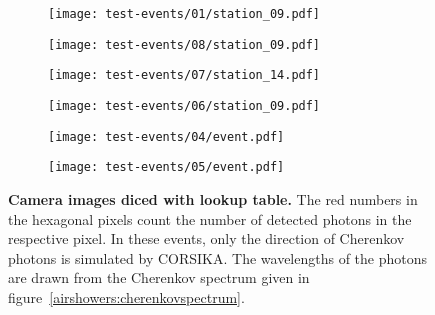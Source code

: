 \begin{figure}[H]
	\centering
	\begin{subfigure}[t]{0.49\textwidth}
		\texttt{[image: test-events/01/station\_09.pdf]}
		\subcaption{}
		\label{corsika-events:1}
	\end{subfigure}
	\hfill
	\begin{subfigure}[t]{0.49\textwidth}
		\texttt{[image: test-events/08/station\_09.pdf]}
		\subcaption{}
		\label{corsika-events:2}
	\end{subfigure}
	\vfill
	\begin{subfigure}[t]{0.49\textwidth}
		\texttt{[image: test-events/07/station\_14.pdf]}
		\subcaption{}
		\label{corsika-events:3}
	\end{subfigure}
	\hfill
	\begin{subfigure}[t]{0.49\textwidth}
		\texttt{[image: test-events/06/station\_09.pdf]}
		\subcaption{}
		\label{corsika-events:4}
	\end{subfigure}
	\hfill
	\begin{subfigure}[t]{0.49\textwidth}
		\texttt{[image: test-events/04/event.pdf]}
		\subcaption{}
		\label{corsika-events:5}
	\end{subfigure}
		\hfill
	\begin{subfigure}[t]{0.49\textwidth}
		\texttt{[image: test-events/05/event.pdf]}
		\subcaption{}
		\label{corsika-events:6}
	\end{subfigure}
	\caption[Camera images diced with lookup table]{\textbf{Camera images diced with lookup table.} The red numbers in the hexagonal pixels count the number of detected photons in the respective pixel. In these events, only the direction of Cherenkov photons is simulated by CORSIKA. The wavelengths of the photons are drawn from the Cherenkov spectrum given in figure~\ref{airshowers:cherenkovspectrum}.}
	\label{corsika-events}
\end{figure}